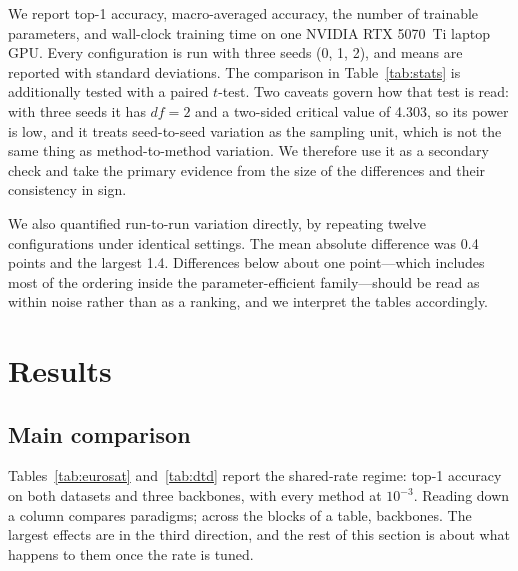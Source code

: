 \documentclass[preprint,12pt]{elsarticle}
\begin{document}
We report top-1 accuracy, macro-averaged accuracy, the number of trainable
parameters, and wall-clock training time on one NVIDIA RTX 5070~Ti laptop GPU.
Every configuration is run with three seeds (0, 1, 2), and means are reported
with standard deviations. The comparison in Table~\ref{tab:stats} is
additionally tested with a paired $t$-test. Two caveats govern how that test is
read: with three seeds it has $df=2$ and a two-sided critical value of 4.303, so
its power is low, and it treats seed-to-seed variation as the sampling unit,
which is not the same thing as method-to-method variation. We therefore use it as
a secondary check and take the primary evidence from the size of the differences
and their consistency in sign.

We also quantified run-to-run variation directly, by repeating twelve
configurations under identical settings. The mean absolute difference was 0.4
points and the largest 1.4. Differences below about one point---which includes
most of the ordering inside the parameter-efficient family---should be read as
within noise rather than as a ranking, and we interpret the tables accordingly.

\section{Results}
\label{sec:results}

\subsection{Main comparison}

Tables~\ref{tab:eurosat} and~\ref{tab:dtd} report the shared-rate regime: top-1
accuracy on both datasets and three backbones, with every method at $10^{-3}$.
Reading down a column compares paradigms; across the blocks of a table, backbones.
The largest effects are in the third direction, and the rest of this section is
about what happens to them once the rate is tuned.
\end{document}

